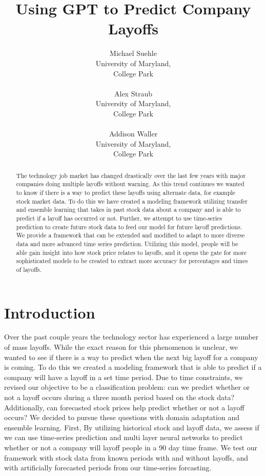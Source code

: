 \documentclass[10pt]{article}
\title{Using GPT to Predict Company Layoffs}
\author{Michael Suehle \\
  University of Maryland, \\
  College Park \\
 \\\And
  Alex Straub \\
  University of Maryland, \\
  College Park \\
  \\\And
  Addison Waller\\
  University of Maryland, \\
  College Park\\}
\begin{document}
\maketitle

\begin{abstract}
	The technology job market has changed drastically over the last few 
  years with major companies doing multiple layoffs without warning. 
  As this trend continues we wanted to know if there is a way to
   predict these layoffs using alternate data, for example stock 
   market data. To do this we have created a modeling framework 
   utilizing transfer and ensemble learning that takes in past stock 
   data about a company and is able to predict if a layoff has 
   occurred or not. Further, we attempt to use time-series prediction 
   to create future stock data to feed our model for future layoff 
   predictions. We provide a framework that can be extended and 
   modified to adapt to more diverse data and more advanced time 
   series prediction. Utilizing this model, people will be able gain 
   insight into how stock price relates to layoffs, and it opens the
    gate for more sophisticated models to be created to extract more 
    accuracy for percentages and times of layoffs. 
\end{abstract}

%
% 

\section{Introduction}
Over the past couple years the technology sector has experienced a 
large number of mass layoffs. While the exact reason for this 
phenomenon is unclear, we wanted to see if there is a way to predict 
when the next big layoff for a company is coming. To do this we 
created a modeling framework that is able to predict if a company 
will have a layoff in a set time period. Due to time constraints, we 
revised our objective to be a classification problem: can we predict 
whether or not a layoff occurs during a three month period based on 
the stock data? Additionally, can forecasted stock prices help predict 
whether or not a layoff occurs? We decided to pursue these questions 
with domain adaptation and ensemble learning. First, By utilizing 
historical stock and layoff data, we assess if we can use time-series 
prediction and multi layer neural networks to predict whether or not a 
company will layoff people in a 90 day time frame. We test our 
framework with stock data from known periods with and without layoffs, 
and with artificially forecasted periods from our time-series 
forcasting. 
\end{document}

